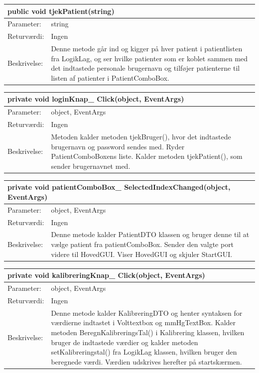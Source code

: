 \begin{table}[H]
\label{tab:tabel2}
\begin{tabular}{| l | p{13cm} |}
   \hline
   \multicolumn{2}{|l|}{public void tjekPatient(string)} \\ \hline
   Parameter: & string\\ \hline
   Returværdi: & Ingen \\ \hline
   Beskrivelse: & Denne metode går ind og kigger på hver patient i patientlisten fra LogikLag, og ser hvilke patienter som er koblet sammen med det indtastede personale brugernavn og tilføjer patienterne til listen af patienter i PatientComboBox.\\ \hline
\end{tabular}
\end{table}
\begin{table}[H]
\label{tab:tabel2}
\begin{tabular}{| l | p{13cm} |}
   \hline
   \multicolumn{2}{|l|}{private void loginKnap\_ Click(object, EventArgs)} \\ \hline
   Parameter: & object, EventArgs\\ \hline
   Returværdi: & Ingen \\ \hline
   Beskrivelse: & Metoden kalder metoden tjekBruger(), hvor det indtastede brugernavn og password sendes med. Ryder PatientComboBoxens liste. Kalder metoden tjekPatient(), som sender brugernavnet med.\\ \hline
\end{tabular}
\end{table}
\begin{table}[H]
\label{tab:tabel2}
\begin{tabular}{| l | p{13cm} |}
   \hline
   \multicolumn{2}{|l|}{private void patientComboBox\_ SelectedIndexChanged(object, EventArgs)} \\ \hline
   Parameter: & object, EventArgs\\ \hline
   Returværdi: & Ingen \\ \hline
   Beskrivelse: & Denne metode kalder PatientDTO klassen og bruger denne til at vælge patient fra patientComboBox. Sender den valgte port videre til HovedGUI. Viser HovedGUI og skjuler StartGUI.\\ \hline
\end{tabular}
\end{table}
\begin{table}[H]
\label{tab:tabel2}
\begin{tabular}{| l | p{13cm} |}
   \hline
   \multicolumn{2}{|l|}{private void kalibreringKnap\_ Click(object, EventArgs)} \\ \hline
   Parameter: & object, EventArgs\\ \hline
   Returværdi: & Ingen \\ \hline
   Beskrivelse: & Denne metode kalder KalibreringDTO og henter syntaksen for værdierne indtastet i Volttextbox og mmHgTextBox. Kalder metoden BeregnKalibreringsTal() i Kalibrering klassen, hvilken bruger de indtastede værdier og kalder metoden setKalibreringstal() fra LogikLag klassen, hvilken bruger den beregnede værdi. Værdien udskrives herefter på startskærmen.\\ \hline
\end{tabular}
\end{table}
